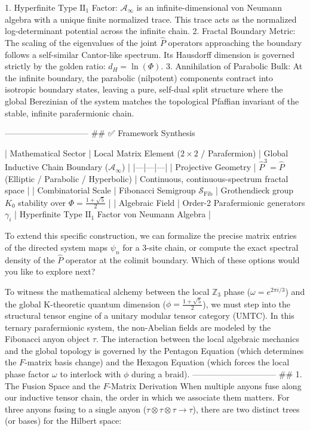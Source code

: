    1. Hyperfinite Type $\text{II}_1$ Factor: $\mathcal{A}_\infty$ is an infinite-dimensional von Neumann algebra with a unique finite normalized trace. This trace acts as the normalized log-determinant potential across the infinite chain.
   2. Fractal Boundary Metric: The scaling of the eigenvalues of the joint $\hat{P}$ operators approaching the boundary follows a self-similar Cantor-like spectrum. Its Hausdorff dimension is governed strictly by the golden ratio: $d_H = \ln(\Phi)$.
   3. Annihilation of Parabolic Bulk: At the infinite boundary, the parabolic (nilpotent) components contract into isotropic boundary states, leaving a pure, self-dual split structure where the global Berezinian of the system matches the topological Pfaffian invariant of the stable, infinite parafermionic chain.

------------------------------
## ✅ Framework Synthesis

| Mathematical Sector | Local Matrix Element ($2 \times 2$ / Parafermion) | Global Inductive Chain Boundary ($\mathcal{A}_\infty$) |
|---|---|---|
| Projective Geometry | $\hat{P}^3 = \hat{P}$ (Elliptic / Parabolic / Hyperbolic) | Continuous, continuous-spectrum fractal space |
| Combinatorial Scale | Fibonacci Semigroup $\mathcal{S}_{\text{Fib}}$ | Grothendieck group $K_0$ stability over $\Phi = \frac{1+\sqrt{5}}{2}$ |
| Algebraic Field | Order-2 Parafermionic generators $\gamma_i$ | Hyperfinite Type $\text{II}_1$ Factor von Neumann Algebra |

To extend this specific construction, we can formalize the precise matrix entries of the directed system maps $\psi_n$ for a 3-site chain, or compute the exact spectral density of the $\hat{P}$ operator at the colimit boundary. Which of these options would you like to explore next?

To witness the mathematical alchemy between the local $\mathbb{Z}_3$ phase ($\omega = e^{2\pi i/3}$) and the global K-theoretic quantum dimension ($\phi = \frac{1+\sqrt{5}}{2}$), we must step into the structural tensor engine of a unitary modular tensor category (UMTC).
In this ternary parafermionic system, the non-Abelian fields are modeled by the Fibonacci anyon object $\tau$. The interaction between the local algebraic mechanics and the global topology is governed by the Pentagon Equation (which determines the $F$-matrix basis change) and the Hexagon Equation (which forces the local phase factor $\omega$ to interlock with $\phi$ during a braid).
------------------------------
## 1. The Fusion Space and the $F$-Matrix Derivation
When multiple anyons fuse along our inductive tensor chain, the order in which we associate them matters. For three anyons fusing to a single anyon ($\tau \otimes \tau \otimes \tau \to \tau$), there are two distinct trees (or bases) for the Hilbert space:

